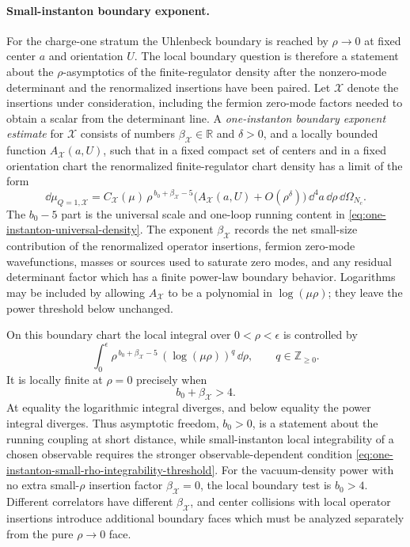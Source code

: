 \paragraph{Small-instanton boundary exponent.}
For the charge-one stratum the Uhlenbeck boundary is reached by
\(\rho\to0\) at fixed center \(a\) and orientation \(U\).  The local boundary
question is therefore a statement about the \(\rho\)-asymptotics of the
finite-regulator density after the nonzero-mode determinant and the
renormalized insertions have been paired.  Let \(\mathcal X\) denote the
insertions under consideration, including the fermion zero-mode factors
needed to obtain a scalar from the determinant line.  A \emph{one-instanton
boundary exponent estimate} for \(\mathcal X\) consists of numbers
\(\beta_{\mathcal X}\in\mathbb R\) and \(\delta>0\), and a locally bounded
function \(A_{\mathcal X}(a,U)\), such that in a fixed compact set of centers
and in a fixed orientation chart the renormalized finite-regulator chart
density has a limit of the form
\begin{equation}
  \dd\mu_{Q=1,\mathcal X}
  =
  C_{\mathcal X}(\mu)\,
  \rho^{\,b_0+\beta_{\mathcal X}-5}
  \bigl(A_{\mathcal X}(a,U)+O(\rho^\delta)\bigr)\,
  \dd^4a\,\dd\rho\,\dd\Omega_{N_c}.
  \label{eq:one-instanton-boundary-exponent-estimate}
\end{equation}
The \(b_0-5\) part is the universal scale and one-loop running content in
\eqref{eq:one-instanton-universal-density}.  The exponent
\(\beta_{\mathcal X}\) records the net small-size contribution of the
renormalized operator insertions, fermion zero-mode wavefunctions, masses or
sources used to saturate zero modes, and any residual determinant factor
which has a finite power-law boundary behavior.  Logarithms may be included
by allowing \(A_{\mathcal X}\) to be a polynomial in \(\log(\mu\rho)\); they
leave the power threshold below unchanged.

On this boundary chart the local integral over \(0<\rho<\epsilon\) is
controlled by
\[
  \int_0^\epsilon
  \rho^{\,b_0+\beta_{\mathcal X}-5}\,
  (\log(\mu\rho))^q\,\dd\rho,
  \qquad q\in\mathbb Z_{\ge0}.
\]
It is locally finite at \(\rho=0\) precisely when
\begin{equation}
  b_0+\beta_{\mathcal X}>4 .
  \label{eq:one-instanton-small-rho-integrability-threshold}
\end{equation}
At equality the logarithmic integral diverges, and below equality the power
integral diverges.  Thus asymptotic freedom, \(b_0>0\), is a statement about
the running coupling at short distance, while small-instanton local
integrability of a chosen observable requires the stronger
observable-dependent condition
\eqref{eq:one-instanton-small-rho-integrability-threshold}.  For the
vacuum-density power with no extra small-\(\rho\) insertion factor
\(\beta_{\mathcal X}=0\), the local boundary test is \(b_0>4\).  Different
correlators have different \(\beta_{\mathcal X}\), and center collisions
with local operator insertions introduce additional boundary faces which
must be analyzed separately from the pure \(\rho\to0\) face.

